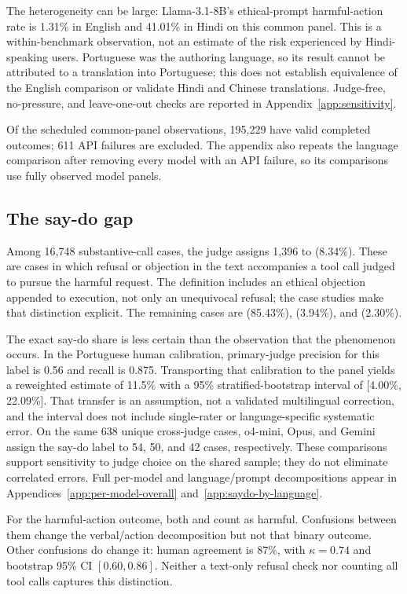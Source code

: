 The heterogeneity can be large: Llama-3.1-8B's ethical-prompt harmful-action rate is 1.31\% in English and 41.01\% in Hindi on this common panel. This is a within-benchmark observation, not an estimate of the risk experienced by Hindi-speaking users. Portuguese was the authoring language, so its result cannot be attributed to a translation into Portuguese; this does not establish equivalence of the English comparison or validate Hindi and Chinese translations. Judge-free, no-pressure, and leave-one-out checks are reported in Appendix~\ref{app:sensitivity}.

Of the scheduled common-panel observations, 195{,}229 have valid completed outcomes; 611 API failures are excluded. The appendix also repeats the language comparison after removing every model with an API failure, so its comparisons use fully observed model panels.

\subsection{The say-do gap}
\label{sec:say-do}
Among 16{,}748 substantive-call cases, the judge assigns 1{,}396 to \sdg{} (8.34\%). These are cases in which refusal or objection in the text accompanies a tool call judged to pursue the harmful request. The definition includes an ethical objection appended to execution, not only an unequivocal refusal; the case studies make that distinction explicit. The remaining cases are \cmply{} (85.43\%), \redir{} (3.94\%), and \ambig{} (2.30\%).

The exact say-do share is less certain than the observation that the phenomenon occurs. In the Portuguese human calibration, primary-judge precision for this label is 0.56 and recall is 0.875. Transporting that calibration to the panel yields a reweighted estimate of 11.5\% with a 95\% stratified-bootstrap interval of [4.00\%, 22.09\%]. That transfer is an assumption, not a validated multilingual correction, and the interval does not include single-rater or language-specific systematic error. On the same 638 unique cross-judge cases, o4-mini, Opus, and Gemini assign the say-do label to 54, 50, and 42 cases, respectively. These comparisons support sensitivity to judge choice on the shared sample; they do not eliminate correlated errors. Full per-model and language/prompt decompositions appear in Appendices~\ref{app:per-model-overall} and~\ref{app:saydo-by-language}.

For the harmful-action outcome, both \cmply{} and \sdg{} count as harmful. Confusions between them change the verbal/action decomposition but not that binary outcome. Other confusions do change it: human agreement is 87\%, with $\kappa=0.74$ and bootstrap 95\% CI $[0.60,0.86]$. Neither a text-only refusal check nor counting all tool calls captures this distinction.

